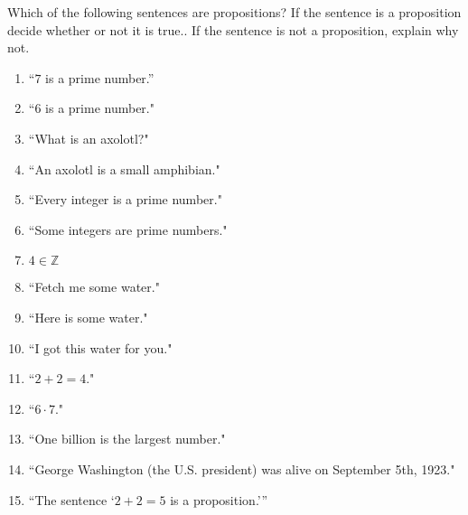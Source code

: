 \begin{xca}
	Which of the following sentences are propositions?  If the sentence is a proposition decide whether or not it is true..  If the sentence is not a proposition, explain why not.
	\begin{enumerate}
		\item ``$7$ is a prime number.''
		\item ``$6$ is a prime number."
		\item ``What is an axolotl?"
		\item ``An axolotl is a small amphibian."
		\item ``Every integer is a prime number."
		\item ``Some integers are prime numbers."
		\item  $4 \in \mathbb{Z}$
		\item ``Fetch me some water."
		\item ``Here is some water."
		\item ``I got this water for you."
		\item ``$2+2 = 4$."
		\item ``$6 \cdot 7$."
		\item ``One billion is the largest number."
		\item ``George Washington (the U.S. president) was alive on September 5th, 1923."
		\item ``The sentence `$2+2 = 5$ is a proposition.'''
	\end{enumerate}
\end{xca}

